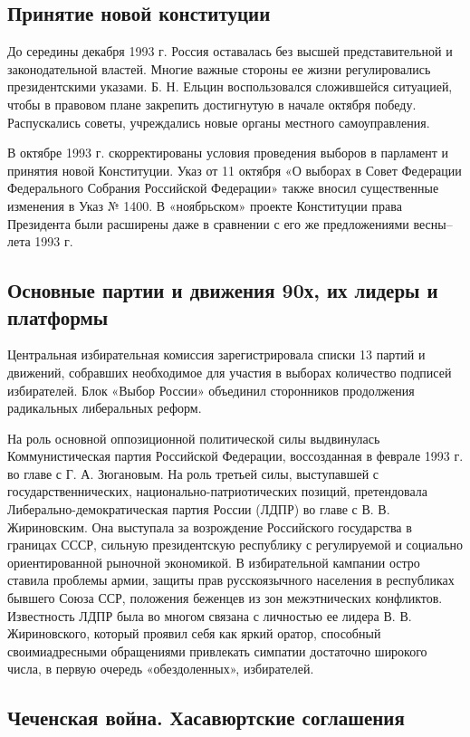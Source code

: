 \subsection{Принятие новой конституции}

До середины декабря 1993 г. Россия оставалась без высшей представительной и законодательной властей. Многие важные стороны ее жизни регулировались президентскими указами. Б. Н. Ельцин воспользовался сложившейся ситуацией, чтобы в правовом плане закрепить достигнутую в начале октября победу. Распускались советы, учреждались новые органы местного самоуправления.

В октябре 1993 г. скорректированы условия проведения выборов в парламент и принятия новой Конституции. Указ от 11 октября «О выборах в Совет Федерации Федерального Собрания Российской Федерации» также вносил существенные изменения в Указ № 1400. В «ноябрьском» проекте Конституции права Президента были расширены даже в сравнении с его же предложениями весны–лета 1993 г.

\subsection{Основные партии и движения 90х, их лидеры и платформы}

Центральная избирательная комиссия зарегистрировала списки 13 партий и движений, собравших необходимое для участия в выборах количество подписей избирателей. Блок «Выбор России» объединил сторонников продолжения радикальных либеральных реформ.

На роль основной оппозиционной политической силы выдвинулась Коммунистическая партия Российской Федерации, воссозданная в феврале 1993 г. во главе с Г. А. Зюгановым. На роль третьей силы, выступавшей с государственнических, национально-патриотических позиций, претендовала Либерально-демократическая партия России (ЛДПР) во главе с В. В. Жириновским. Она выступала за возрождение Российского государства в границах СССР, сильную президентскую республику с регулируемой и социально ориентированной рыночной экономикой. В избирательной кампании остро ставила проблемы армии, защиты прав русскоязычного населения в республиках бывшего Союза ССР, положения беженцев из зон межэтнических конфликтов. Известность ЛДПР была во многом связана с личностью ее лидера В. В. Жириновского, который проявил себя как яркий оратор, способный своимиадресными обращениями привлекать симпатии достаточно широкого числа, в первую очередь «обездоленных», избирателей.

\subsection{Чеченская война. Хасавюртские соглашения}

